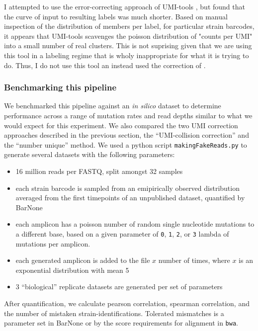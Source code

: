 I attempted to use the error-correcting approach of UMI-tools
\parencite{smith2017umi}, but found that the curve of input to 
resulting labels was much shorter. Based on manual inspection of the
distribution of members per label, for particular strain barcodes,
it appears that UMI-tools scavenges the poisson distribution of
"counts per UMI" into a small number of real clusters. This is not
suprising given that we are using this tool in a labeling regime that
is wholy inappropriate for what it is trying to do. Thus, I do not use
this tool an instead used the correction of \cite{fu2011counting}.

\subsubsection{Benchmarking this pipeline}

We benchmarked this pipeline against an \emph{in silico} dataset to
determine performance across a range of mutation rates and read depths
similar to what we would expect for this experiment. We also compared
the two UMI correction approaches described in the previous section, the
``UMI-collision correction'' and the ``number unique'' method. We used a
python script \texttt{makingFakeReads.py} to generate several datasets
with the following parameters:

\begin{itemize}
  \setlength\itemsep{1em}
  \item
  16 million reads per FASTQ, split amongst 32 samples
  \item
  each strain barcode is sampled from an emipirically observed
  distribution averaged from the first timepoints of an unpublished
  dataset, quantified by BarNone
  \item
  each amplicon has a poisson number of random single nucleotide
  mutations to a different base, based on a given parameter of
  \texttt{0}, \texttt{1}, \texttt{2}, or \texttt{3} lambda of mutations
  per amplicon.
  \item
  each generated amplicon is added to the file \(x\) number of times,
  where \(x\) is an exponential distribution with mean 5
  \item
  3 ``biological'' replicate datasets are generated per set of
  parameters
\end{itemize}

After quantification, we calculate pearson correlation, spearman
correlation, and the number of mistaken strain-identifications.
Tolerated mismatches is a parameter set in BarNone or by the score
requirements for alignment in \texttt{bwa}.

